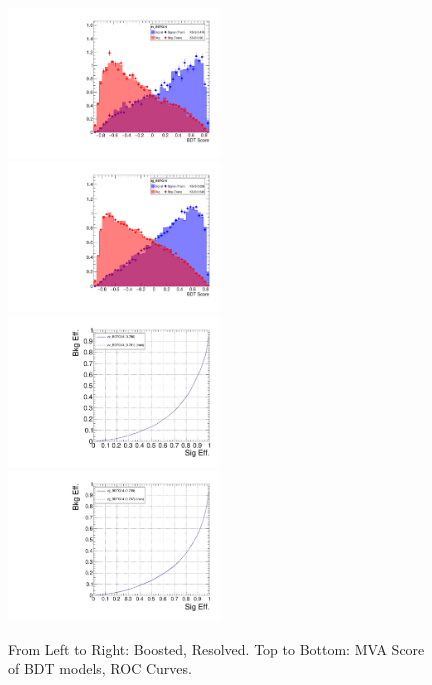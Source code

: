 \begin{figure}[!ht]
  \centering
  \includegraphics[width=0.5\textwidth]{analysis_plots/tmva_plots/zv_BDTG14.pdf} \hspace{-10pt}
  \includegraphics[width=0.5\textwidth]{analysis_plots/tmva_plots/zjj_BDTG14.pdf} \hspace{-10pt} \\
  \includegraphics[width=0.5\textwidth]{analysis_plots/tmva_plots/zv_BDTG14_roc.pdf} \hspace{-10pt}
  \includegraphics[width=0.5\textwidth]{analysis_plots/tmva_plots/zjj_BDTG14_roc.pdf} \hspace{-10pt}
  \caption[MVA Score ROC Curve]%
  {From Left to Right: Boosted, Resolved. Top to Bottom: MVA Score of BDT models,
    ROC Curves.}%
  \label{fig:vbs-training-score}
\end{figure}

